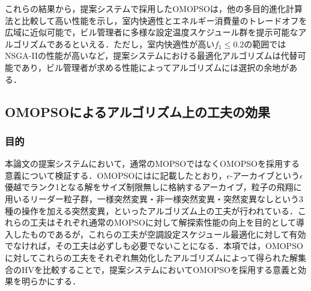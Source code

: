 これらの結果から，提案システムで採用したOMOPSOは，他の多目的進化計算法と比較して高い性能を示し，室内快適性とエネルギー消費量のトレードオフを広域に近似可能で，ビル管理者に多様な設定温度スケジュール群を提示可能なアルゴリズムであるといえる．ただし，室内快適性が高い$f_1 \leq 0.2$の範囲ではNSGA-IIの性能が高いなど，提案システムにおける最適化アルゴリズムは代替可能であり，ビル管理者が求める性能によってアルゴリズムには選択の余地がある．

\subsection{OMOPSOによるアルゴリズム上の工夫の効果}
\subsubsection{目的}
本論文の提案システムにおいて，通常のMOPSOではなくOMOPSOを採用する意義について検証する．OMOPSOにはに記載したとおり，$\epsilon$-アーカイブという$\epsilon$優越でランク1となる解をサイズ制限無しに格納するアーカイブ，粒子の飛翔に用いるリーダー粒子群，一様突然変異・非一様突然変異・突然変異なしという3種の操作を加える突然変異，といったアルゴリズム上の工夫が行われている．これらの工夫はそれぞれ通常のMOPSOに対して解探索性能の向上を目的として導入したものであるが，これらの工夫が空調設定スケジュール最適化に対して有効でなければ，その工夫は必ずしも必要でないことになる．本項では，OMOPSOに対してこれらの工夫をそれぞれ無効化したアルゴリズムによって得られた解集合のHVを比較することで，提案システムにおいてOMOPSOを採用する意義と効果を明らかにする．

